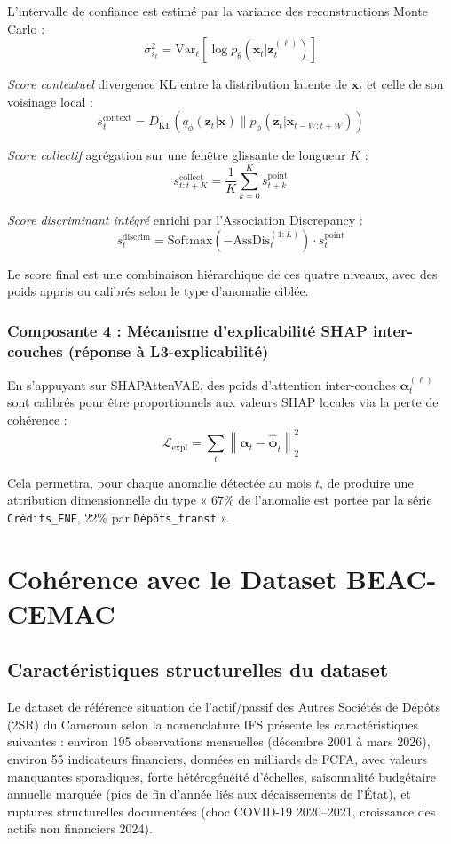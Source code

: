 \documentclass[12pt,a4paper]{article}
\begin{document}
L'intervalle de confiance est estimé par la variance des reconstructions Monte Carlo :
$$\sigma^2_{s_t} = \mathrm{Var}_\ell\!\left[\log p_\theta(\mathbf{x}_t|\mathbf{z}_t^{(\ell)})\right]$$

\textit{Score contextuel}  divergence KL entre la distribution latente de $\mathbf{x}_t$ et celle de son voisinage local :
$$s^{\mathrm{context}}_t = D_{\mathrm{KL}}(q_\phi(\mathbf{z}_t|\mathbf{x})\|p_\phi(\mathbf{z}_t|\mathbf{x}_{t-W:t+W}))$$

\textit{Score collectif}  agrégation sur une fenêtre glissante de longueur $K$ :
$$s^{\mathrm{collect}}_{t:t+K} = \frac{1}{K}\sum_{k=0}^{K}s^{\mathrm{point}}_{t+k}$$

\textit{Score discriminant intégré}  enrichi par l'Association Discrepancy :
$$s^{\mathrm{discrim}}_t = \mathrm{Softmax}(-\mathrm{AssDis}^{(1:L)}_t) \cdot s^{\mathrm{point}}_t$$

Le score final est une combinaison hiérarchique de ces quatre niveaux, avec des poids appris ou calibrés selon le type d'anomalie ciblée.

\subsubsection{Composante 4 : Mécanisme d'explicabilité SHAP inter-couches (réponse à L3-explicabilité)}

En s'appuyant sur SHAPAttenVAE, des poids d'attention inter-couches $\boldsymbol{\alpha}^{(\ell)}_t$ sont calibrés pour être proportionnels aux valeurs SHAP locales via la perte de cohérence :
$$\mathcal{L}_{\mathrm{expl}} = \sum_t\left\|\boldsymbol{\alpha}_t - \hat{\boldsymbol{\phi}}_t\right\|_2^2$$

Cela permettra, pour chaque anomalie détectée au mois $t$, de produire une attribution dimensionnelle du type « 67\% de l'anomalie est portée par la série \texttt{Crédits\_ENF}, 22\% par \texttt{Dépôts\_transf} ».

\section{Cohérence avec le Dataset BEAC-CEMAC}

\subsection{Caractéristiques structurelles du dataset}

Le dataset de référence  situation de l'actif/passif des Autres Sociétés de Dépôts (2SR) du Cameroun selon la nomenclature IFS  présente les caractéristiques suivantes : environ 195 observations mensuelles (décembre 2001 à mars 2026), environ 55 indicateurs financiers, données en milliards de FCFA, avec valeurs manquantes sporadiques, forte hétérogénéité d'échelles, saisonnalité budgétaire annuelle marquée (pics de fin d'année liés aux décaissements de l'État), et ruptures structurelles documentées (choc COVID-19 2020--2021, croissance des actifs non financiers 2024).
\end{document}
